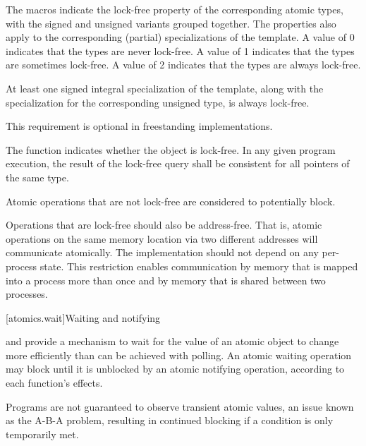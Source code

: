 \pnum
The  macros indicate the lock-free property of the
corresponding atomic types, with the signed and unsigned variants grouped
together. The properties also apply to the corresponding (partial) specializations of the
 template. A value of 0 indicates that the types are never
lock-free. A value of 1 indicates that the types are sometimes lock-free. A
value of 2 indicates that the types are always lock-free.

\pnum
At least one signed integral specialization of the  template,
along with the specialization
for the corresponding unsigned type,
is always lock-free.
\begin{note}
This requirement is optional in freestanding implementations.
\end{note}

\pnum
The function 
indicates whether the object is lock-free. In any given program execution, the
result of the lock-free query shall be consistent for all pointers of the same
type.

\pnum
Atomic operations that are not lock-free are considered to potentially
block.

\pnum
\begin{note}
Operations that are lock-free should also be address-free. That is,
atomic operations on the same memory location via two different addresses will
communicate atomically. The implementation should not depend on any
per-process state. This restriction enables communication  by memory that is
mapped into a process more than once and by memory that is shared between two
processes.
\end{note}

[atomics.wait]{Waiting and notifying}

\pnum
{}
and 
provide a mechanism to wait for the value of an atomic object to change
more efficiently than can be achieved with polling.
An atomic waiting operation may block until it is unblocked
by an atomic notifying operation, according to each function's effects.
\begin{note}
Programs are not guaranteed to observe transient atomic values,
an issue known as the A-B-A problem,
resulting in continued blocking if a condition is only temporarily met.
\end{note}

